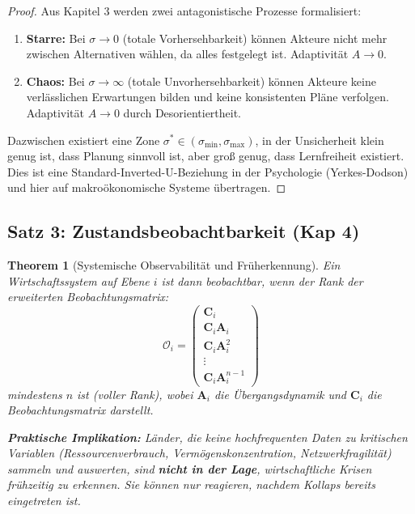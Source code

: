 \documentclass[a4paper, 12pt, twoside, openright]{report}
\newtheorem{theorem}{Theorem}[section]
\theoremstyle{definition}
\theoremstyle{definition}
\begin{document}
\begin{proof}
Aus Kapitel 3 werden zwei antagonistische Prozesse formalisiert:
\begin{enumerate}
\item \textbf{Starre:} Bei $\sigma \to 0$ (totale Vorhersehbarkeit) können Akteure nicht mehr zwischen Alternativen wählen, da alles festgelegt ist. Adaptivität $A \to 0$.
\item \textbf{Chaos:} Bei $\sigma \to \infty$ (totale Unvorhersehbarkeit) können Akteure keine verlässlichen Erwartungen bilden und keine konsistenten Pläne verfolgen. Adaptivität $A \to 0$ durch Desorientiertheit.
\end{enumerate}

Dazwischen existiert eine Zone $\sigma^* \in (\sigma_{\min}, \sigma_{\max})$, in der Unsicherheit klein genug ist, dass Planung sinnvoll ist, aber groß genug, dass Lernfreiheit existiert. Dies ist eine Standard-Inverted-U-Beziehung in der Psychologie (Yerkes-Dodson) und hier auf makroökonomische Systeme übertragen.
\end{proof}

\subsection{Satz 3: Zustandsbeobachtbarkeit (Kap 4)}

\begin{theorem}[Systemische Observabilität und Früherkennung]
\label{thm:observabilitaet}
Ein Wirtschaftssystem auf Ebene $i$ ist dann beobachtbar, wenn der Rank der erweiterten Beobachtungsmatrix:
\begin{equation}
\mathcal{O}_i = \begin{pmatrix}
\mathbf{C}_i \\
\mathbf{C}_i \mathbf{A}_i \\
\mathbf{C}_i \mathbf{A}_i^2 \\
\vdots \\
\mathbf{C}_i \mathbf{A}_i^{n-1}
\end{pmatrix}
\end{equation}
mindestens $n$ ist (voller Rank), wobei $\mathbf{A}_i$ die Übergangsdynamik und $\mathbf{C}_i$ die Beobachtungsmatrix darstellt.

\textbf{Praktische Implikation:} Länder, die keine hochfrequenten Daten zu kritischen Variablen (Ressourcenverbrauch, Vermögenskonzentration, Netzwerkfragilität) sammeln und auswerten, sind \textbf{nicht in der Lage}, wirtschaftliche Krisen frühzeitig zu erkennen. Sie können nur reagieren, nachdem Kollaps bereits eingetreten ist.
\end{theorem}
\end{document}

